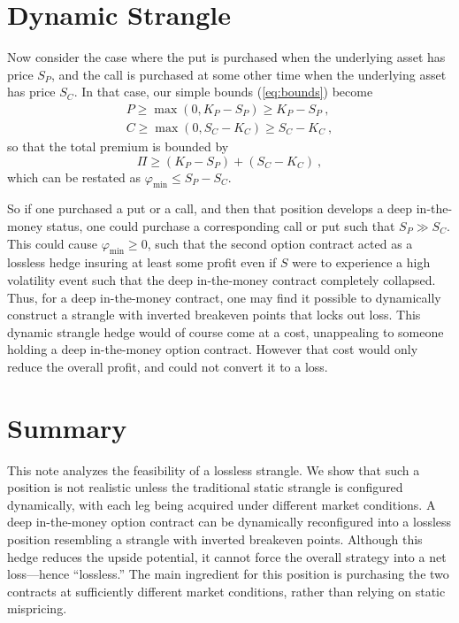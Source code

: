 \documentclass[aps,reprint]{revtex4-2}
\begin{document}
\section{Dynamic Strangle}
Now consider the case where the put is purchased when the underlying asset has price $S_P$, and the call is purchased at some other time when the underlying asset has price $S_C$.  In that case, our simple bounds (\ref{eq:bounds}) become
\begin{subequations} \label{eq:dynamicbounds}
\begin{align}
P \ge \max(0, K_P - S_P) \ge K_P - S_P~,\\
C \ge \max(0, S_C - K_C) \ge S_C - K_C~,
\end{align}
\end{subequations}
so that the total premium is bounded by
\begin{equation}
\Pi \ge (K_P - S_P) + (S_C - K_C)~,
\end{equation}
which can be restated as $\varphi_{\min} \le S_P - S_C$.

So if one purchased a put or a call, and then that position develops a deep in-the-money status, one could purchase a corresponding call or put such that $S_P \gg S_C$.  This could cause $\varphi_{\min} \ge 0$, such that the second option contract acted as a lossless hedge insuring at least some profit even if $S$ were to experience a high volatility event such that the deep in-the-money contract completely collapsed.
Thus, for a deep in-the-money contract, one may find it possible to dynamically construct a strangle with inverted breakeven points that locks out loss.  This dynamic strangle hedge would of course come at a cost, unappealing to someone holding a deep in-the-money option contract. However that cost would only reduce the overall profit, and could not convert it to a loss.

\section{Summary}

This note analyzes the feasibility of a lossless strangle. We show that such a position is not realistic unless the traditional static strangle is configured dynamically, with each leg being acquired under different market conditions.  A deep in-the-money option contract can be dynamically reconfigured into a lossless position resembling a strangle with inverted breakeven points.  Although this hedge reduces the upside potential, it cannot force the overall strategy into a net loss—hence “lossless.”  The main ingredient for this position is purchasing the two contracts at sufficiently different market conditions, rather than relying on static mispricing.
\end{document}
